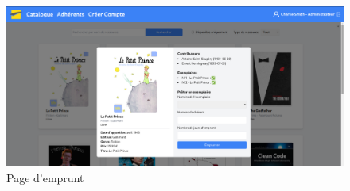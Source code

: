 \documentclass{report-UTC}
\begin{document}
\begin{figure}[H]
\centering
\includegraphics[width=15cm]{./images/emprunt.png}
\caption{Page d'emprunt}
\end{figure}
\end{document}
